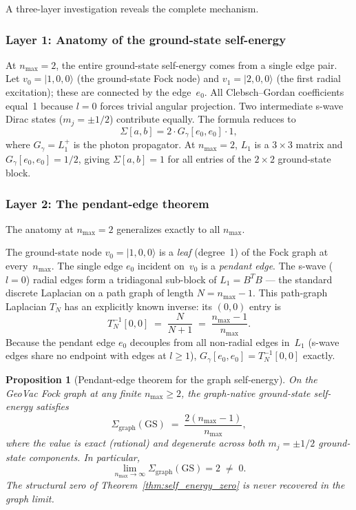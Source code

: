 \documentclass[11pt]{article}
\newtheorem{proposition}{Proposition}
\begin{document}
A three-layer investigation reveals the complete mechanism.

\subsubsection{Layer 1: Anatomy of the ground-state self-energy}

At $n_{\max} = 2$, the entire ground-state self-energy comes from a
single edge pair.  Let $v_0 = |1, 0, 0\rangle$ (the ground-state Fock
node) and $v_1 = |2, 0, 0\rangle$ (the first radial excitation); these
are connected by the edge~$e_0$.  All Clebsch--Gordan coefficients
equal~1 because $l = 0$ forces trivial angular projection.  Two
intermediate s-wave Dirac states ($m_j = \pm 1/2$) contribute equally.
The formula reduces to
\[
  \Sigma[a,b] = 2 \cdot G_\gamma[e_0, e_0] \cdot 1,
\]
where $G_\gamma = L_1^+$ is the photon propagator.  At $n_{\max} = 2$,
$L_1$ is a $3 \times 3$ matrix and $G_\gamma[e_0, e_0] = 1/2$,
giving $\Sigma[a,b] = 1$ for all entries of the $2 \times 2$
ground-state block.

\subsubsection{Layer 2: The pendant-edge theorem}

The anatomy at $n_{\max} = 2$ generalizes exactly to all $n_{\max}$.

The ground-state node $v_0 = |1,0,0\rangle$ is a \emph{leaf} (degree~1)
of the Fock graph at every~$n_{\max}$.  The single edge $e_0$ incident
on~$v_0$ is a \emph{pendant edge}.  The s-wave ($l = 0$) radial edges
form a tridiagonal sub-block of $L_1 = B^TB$ --- the standard discrete
Laplacian on a path graph of length $N = n_{\max} - 1$.  This path-graph
Laplacian $T_N$ has an explicitly known inverse: its $(0,0)$ entry is
\[
  T_N^{-1}[0,0] \;=\; \frac{N}{N+1}
  \;=\; \frac{n_{\max} - 1}{n_{\max}}.
\]
Because the pendant edge $e_0$ decouples from all non-radial edges
in~$L_1$ (s-wave edges share no endpoint with edges at $l \ge 1$),
$G_\gamma[e_0, e_0] = T_N^{-1}[0,0]$ exactly.

\begin{proposition}[Pendant-edge theorem for the graph self-energy]
\label{prop:pendant_edge}
On the GeoVac Fock graph at any finite $n_{\max} \ge 2$, the
graph-native ground-state self-energy satisfies
\begin{equation}
  \Sigma_{\mathrm{graph}}(\mathrm{GS})
  \;=\; \frac{2(n_{\max} - 1)}{n_{\max}},
  \label{eq:pendant_edge}
\end{equation}
where the value is exact (rational) and degenerate across both
$m_j = \pm 1/2$ ground-state components.  In particular,
\begin{equation}
  \lim_{n_{\max} \to \infty} \Sigma_{\mathrm{graph}}(\mathrm{GS}) = 2
  \;\neq\; 0.
  \label{eq:pendant_limit}
\end{equation}
The structural zero of Theorem~\ref{thm:self_energy_zero} is never
recovered in the graph limit.
\end{proposition}
\end{document}
